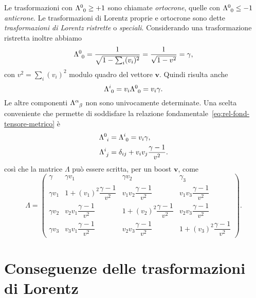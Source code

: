 Le trasformazioni con $\tensor{\Lambda}{^{0}_{0}} \geq +1$ sono chiamate
\emph{ortocrone}, quelle con $\tensor{\Lambda}{^{0}_{0}} \leq -1$
\emph{anticrone}.  Le trasformazioni di Lorentz proprie e ortocrone sono dette
\emph{trasformazioni di Lorentz ristrette} o \emph{speciali}.  Considerando una
trasformazione ristretta inoltre abbiamo
\begin{equation}
  \tensor{\Lambda}{^{0}_{0}} = \frac{1}{\sqrt{1-\sum_{i}(v_{i})^{2}}} =
  \frac{1}{\sqrt{1-v^{2}}} = \gamma,
\end{equation}
con $v^{2} = \sum_{i}(v_{i})^{2}$ modulo quadro del vettore $\bm{v}$.  Quindi
risulta anche
\begin{equation}
  \tensor{\Lambda}{^{i}_{0}} = v_{i}\tensor{\Lambda}{^{0}_{0}} = v_{i}\gamma.
\end{equation}
Le altre componenti $\tensor{\Lambda}{^{\alpha}_{\beta}}$ non sono univocamente
determinate.  Una scelta conveniente che permette di soddisfare
la relazione fondamentale~\eqref{eq:rel-fond-tensore-metrico} è
\begin{subequations}
  \begin{align}
    \tensor{\Lambda}{^{0}_{i}} &= \tensor{\Lambda}{^{i}_{0}} = v_{i}\gamma, \\
    \tensor{\Lambda}{^{i}_{j}} &= \delta_{ij} +
    v_{i}v_{j}\frac{\gamma-1}{v^{2}}.
  \end{align}
\end{subequations}
così che la matrice $\Lambda$ può essere scritta, per un boost
$\bm{v}$, come
\begin{equation}
  \Lambda =
  \begin{pmatrix}
    \gamma & \gamma v_{1} & \gamma v_{2} & \gamma _{3} \\[2.0ex]
    \gamma v_{1} & 1 + (v_{1})^{2}\dfrac{\gamma-1}{v^{2}} &
    v_{1}v_{2}\dfrac{\gamma-1}{v^{2}} & v_{1} v_{3}\dfrac{\gamma-1}{v^{2}}
    \\[2.0ex]
    \gamma v_{2} & v_{2}v_{1}\dfrac{\gamma-1}{v^{2}} & 1 +
    (v_{2})^{2}\dfrac{\gamma-1}{v^{2}} & v_{2}v_{3}\dfrac{\gamma-1}{v^{2}}
    \\[2.0ex]
    \gamma v_{3} & v_{3}v_{1}\dfrac{\gamma-1}{v^{2}} &
    v_{2}v_{3}\dfrac{\gamma-1}{v^{2}} & 1 + (v_{3})^{2}\dfrac{\gamma-1}{v^{2}}
  \end{pmatrix}.
\end{equation}


\section{Conseguenze delle trasformazioni di Lorentz}
\label{sec:conseguenze-lorentz}

